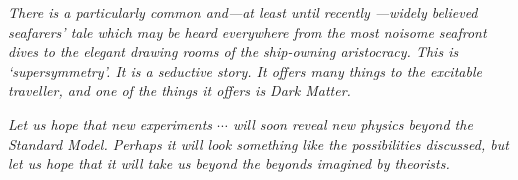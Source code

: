 
\begin{dedication} 

\textit{There is a particularly common and---at least until recently	---widely believed seafarers’ tale which may be heard everywhere from the most noisome seafront dives to the elegant drawing rooms of the ship-owning aristocracy. This is ‘supersymmetry’. It is a seductive story. It offers many things to the excitable traveller,	 and	 one of the things it offers is Dark Matter. }

\textit{Let us hope that new experiments $\cdots$ will soon reveal new physics beyond the Standard Model. Perhaps it will look something like the possibilities discussed, but let us hope that it will take us beyond the beyonds imagined by theorists.
}

\end{dedication}

